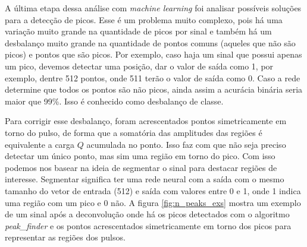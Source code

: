 \documentclass[a4paper,12pt,oneside]{book}
\begin{document}
\par A última etapa dessa análise com \textit{machine learning} foi analisar possíveis soluções para a detecção de picos. Esse é um problema muito complexo, pois há uma variação muito grande na quantidade de picos por sinal e também há um desbalanço muito grande na quantidade de pontos comuns (aqueles que não são picos) e pontos que são picos. Por exemplo, caso haja um sinal que possui apenas um pico, devemos detectar uma posição, dar o valor de saída como 1, por exemplo, dentre 512 pontos, onde 511 terão o valor de saída como 0. Caso a rede determine que todos os pontos são não picos, ainda assim a acurácia binária seria maior que 99\%. Isso é conhecido como desbalanço de classe\cite{inproceedings}.

\par Para corrigir esse desbalanço, foram acrescentados pontos simetricamente em torno do pulso, de forma que a somatória das amplitudes das regiões é equivalente a carga $Q$ acumulada no ponto. Isso faz com que não seja preciso detectar um único ponto, mas sim uma região em torno do pico. Com isso podemos nos basear na ideia de segmentar o sinal para destacar regiões de interesse\cite{aly2011research}. Segmentar significa ter uma rede neural com a saída com o mesmo tamanho do vetor de entrada (512) e saída com valores entre 0 e 1, onde 1 indica uma região com um pico e 0 não. A figura \ref{fig:n_peaks_exs} mostra um exemplo de um sinal após a deconvolução onde há os picos detectados com o algoritmo \textit{peak\_finder} e os pontos acrescentados simetricamente em torno dos picos para representar as regiões dos pulsos.

\end{document}
